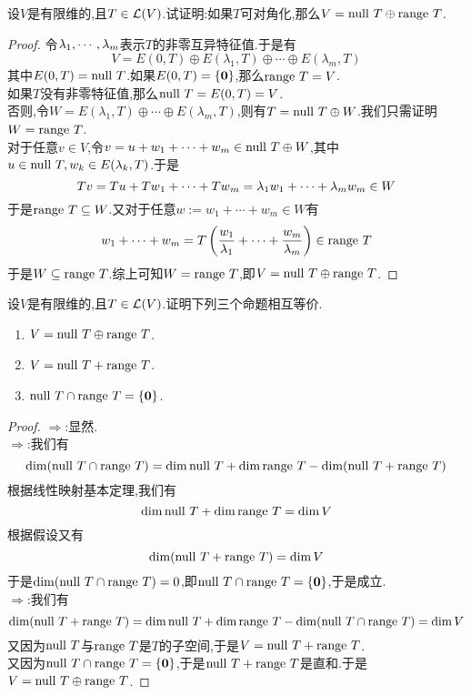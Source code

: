 \documentclass{ctexart}
\begin{document}
\begin{problem}[3.]
    设$V$是有限维的,且$T\in\mathcal{L}(V)$.试证明:如果$T$可对角化,那么$V=\text{null } T\oplus\text{range } T$.
\end{problem}
\begin{proof}
    令${\lambda}_1,\cdots,{\lambda}_{m}$表示$T$的非零互异特征值.于是有
    \[V=E(0,T)\oplus E(\lambda_1,T)\oplus\cdots\oplus E(\lambda_m,T)\]
    其中$E(0,T)=\text{null } T$.如果$E(0,T)=\{\mathbf0\}$,那么$\text{range } T=V$.\\
    如果$T$没有非零特征值,那么$\text{null } T=E(0,T)=V$.\\
    否则,令$W=E(\lambda_1,T)\oplus\cdots\oplus E(\lambda_m,T)$,则有$T=\text{null } T\oplus W$.我们只需证明$W=\text{range } T$.\\
    对于任意$v\in V$,令$v=u+{w}_1+\cdots+{w}_{m}\in\text{null } T\oplus W$,其中$u\in\text{null } T,w_k\in E(\lambda_k,T)$.于是
    \[Tv=Tu+{Tw}_1+\cdots+{Tw}_{m}=\lambda_1w_1+\cdots+\lambda_mw_m\in W\]
    于是$\text{range } T\subseteq W$.又对于任意$w:=w_1+\cdots+w_m\in W$有
    \[{w}_1+\cdots+{w}_{m}=T\left(\dfrac{w_1}{\lambda_1}+\cdots+\dfrac{w_m}{\lambda_m}\right)\in\text{range } T\]
    于是$W\subseteq\text{range } T$.综上可知$W=\text{range } T$,即$V=\text{null } T\oplus\text{range } T$.
\end{proof}
\begin{problem}[4.]
    设$V$是有限维的,且$T\in\mathcal{L}(V)$.证明下列三个命题相互等价.
    \begin{enumerate}[label=\tbf{(\alph*)}]
        \item $V=\text{null } T\oplus\text{range } T$.
        \item $V=\text{null } T+\text{range } T$.
        \item $\text{null } T\cap\text{range } T=\{\mathbf0\}$.
    \end{enumerate}
\end{problem}
\begin{proof}
    $\Rightarrow$:显然.\\
    $\Rightarrow$:我们有
    \[\dim(\text{null } T\cap\text{range } T)=\dim\text{null } T+\dim\text{range } T-\dim(\text{null } T+\text{range } T)\]
    根据线性映射基本定理,我们有
    \[\dim\text{null } T+\dim\text{range } T=\dim V\]
    根据假设又有
    \[\dim(\text{null } T+\text{range } T)=\dim V\]
    于是$\dim(\text{null } T\cap\text{range } T)=0$,即$\text{null } T\cap\text{range } T=\{\mathbf0\}$,于是成立.\\
    $\Rightarrow$:我们有
    \[\dim(\text{null } T+\text{range } T)=\dim\text{null } T+\dim\text{range } T-\dim(\text{null } T\cap\text{range } T)=\dim V\]
    又因为$\text{null } T$与$\text{range } T$是$T$的子空间,于是$V=\text{null } T+\text{range } T$.\\
    又因为$\text{null } T\cap\text{range } T=\{\mathbf0\}$,于是$\text{null } T+\text{range } T$是直和.于是$V=\text{null } T\oplus\text{range } T$.
\end{proof}
\end{document}

